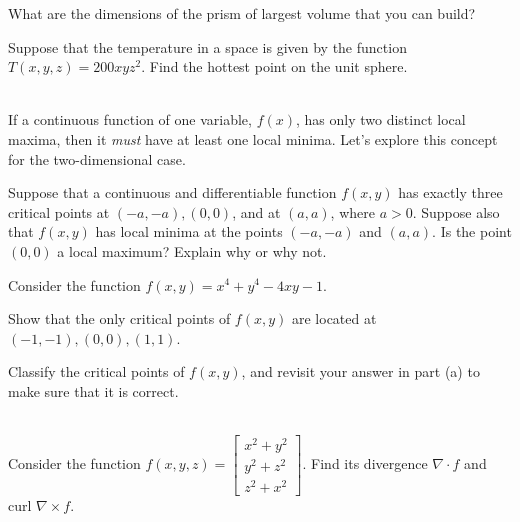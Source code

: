 What are the dimensions of the prism of largest volume that you can build?

\item
{}

Suppose that the temperature in a space is given by the function
$T(x,y,z) = 200xyz^2$.  Find the hottest point on the unit sphere.

\item %
\\
If a continuous function of one variable, $f(x)$, has only two distinct local maxima, then it \textit{must} have at least one local minima. Let's explore this concept for the two-dimensional case. 
\BEN
\item Suppose that a continuous and differentiable function $f(x,y)$ has exactly three critical points at $(-a,-a),(0,0)$, and at $(a,a)$, where $a>0$. Suppose also that $f(x,y)$ has local minima at the points $(-a,-a)$ and $(a,a)$. Is the point $(0,0)$ a local maximum? Explain why or why not.
\item Consider the function $f(x,y)=x^4+y^4-4xy-1$. 
\BEN
\item Show that the only critical points of $f(x,y)$ are located at $(-1,-1),(0,0),(1,1)$. 
\item Classify the critical points of $f(x,y)$, and revisit your answer in part (a) to make sure that it is correct. 
\EEN
\EEN
\item
{}\\
Consider the function $f(x,y,z) = \begin{bmatrix}
                                   x^2 + y^2 \\
                                   y^2 + z^2 \\
                                   z^2 + x^2
                                  \end{bmatrix}$.
Find its divergence $\nabla \cdot f$ and curl $\nabla \times f$.


\EEN
